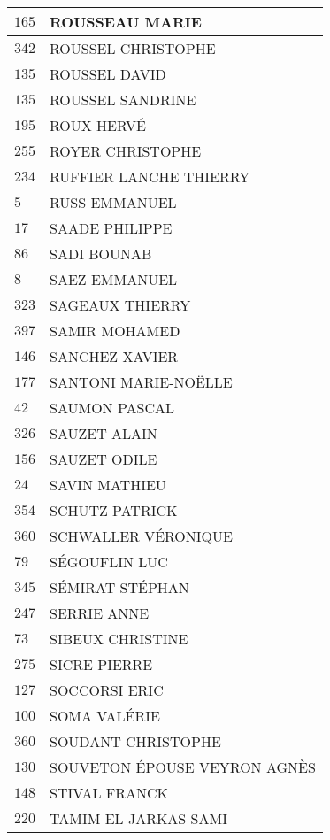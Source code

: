 \begin{xltabular}{\linewidth}{|l|X|}
    \hline
    $165$ & ROUSSEAU MARIE \\
    \hline
    $342$ & ROUSSEL CHRISTOPHE \\
    \hline
    $135$ & ROUSSEL DAVID \\
    \hline
    $135$ & ROUSSEL SANDRINE \\
    \hline
    $195$ & ROUX HERVÉ \\
    \hline
    $255$ & ROYER CHRISTOPHE \\
    \hline
    $234$ & RUFFIER LANCHE THIERRY \\
    \hline
    $5$ & RUSS EMMANUEL \\
    \hline
    $17$ & SAADE PHILIPPE \\
    \hline
    $86$ & SADI BOUNAB \\
    \hline
    $8$ & SAEZ EMMANUEL \\
    \hline
    $323$ & SAGEAUX THIERRY \\
    \hline
    $397$ & SAMIR MOHAMED \\
    \hline
    $146$ & SANCHEZ XAVIER \\
    \hline
    $177$ & SANTONI MARIE-NOËLLE \\
    \hline
    $42$ & SAUMON PASCAL \\
    \hline
    $326$ & SAUZET ALAIN \\
    \hline
    $156$ & SAUZET ODILE \\
    \hline
    $24$ & SAVIN MATHIEU \\
    \hline
    $354$ & SCHUTZ PATRICK \\
    \hline
    $360$ & SCHWALLER VÉRONIQUE \\
    \hline
    $79$ & SÉGOUFLIN LUC \\
    \hline
    $345$ & SÉMIRAT STÉPHAN \\
    \hline
    $247$ & SERRIE ANNE \\
    \hline
    $73$ & SIBEUX CHRISTINE \\
    \hline
    $275$ & SICRE PIERRE \\
    \hline
    $127$ & SOCCORSI ERIC \\
    \hline
    $100$ & SOMA VALÉRIE \\
    \hline
    $360$ & SOUDANT CHRISTOPHE \\
    \hline
    $130$ & SOUVETON ÉPOUSE VEYRON AGNÈS \\
    \hline
    $148$ & STIVAL FRANCK \\
    \hline
    $220$ & TAMIM-EL-JARKAS SAMI \\

\end{xltabular}

